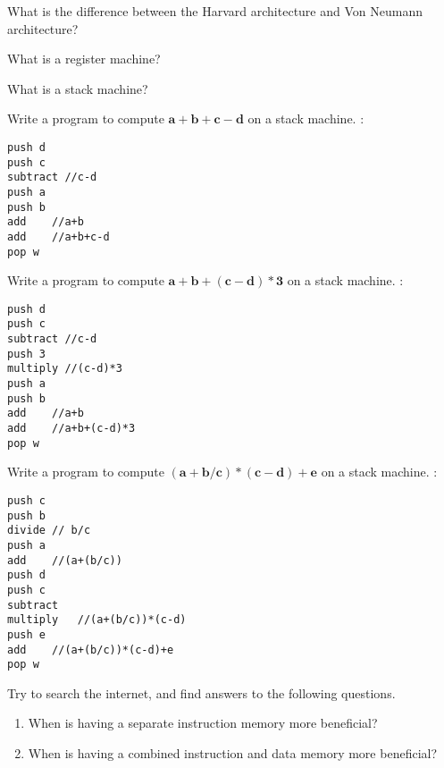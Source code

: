 \begin{ExerciseList}
\Exercise What is the difference between the Harvard architecture and Von Neumann
architecture?

\Exercise What is a register machine? 

\Exercise What is a stack machine? 


\Exercise
Write a program to compute $\mathbf{a + b + c - d}$ on a stack machine. 
\Answer:
\begin{Verbatim}[frame=single]
push d 
push c 
subtract //c-d
push a 
push b 
add    //a+b
add    //a+b+c-d 
pop w
\end{Verbatim}
\Exercise
Write a program to compute $\mathbf{a + b + (c - d)*3}$  on a stack machine. 
\Answer:
\begin{Verbatim}[frame=single]
push d 
push c 
subtract //c-d
push 3
multiply //(c-d)*3
push a 
push b 
add    //a+b
add    //a+b+(c-d)*3
pop w
\end{Verbatim}
\Exercise
Write a program to compute $\mathbf{(a + b/c) *(c - d)+e}$
on a stack machine. 
\Answer:
\begin{Verbatim}[frame=single]
push c
push b
divide // b/c
push a
add    //(a+(b/c))
push d
push c
subtract
multiply   //(a+(b/c))*(c-d)
push e
add    //(a+(b/c))*(c-d)+e
pop w

\end{Verbatim}
\Exercise[difficulty=2]
Try to search the internet, and find answers to the following questions.  
\begin{enumerate}
\item When is having a separate instruction memory more beneficial?
\item When is having a combined instruction and data memory more beneficial?
\end{enumerate}


\end{ExerciseList}



